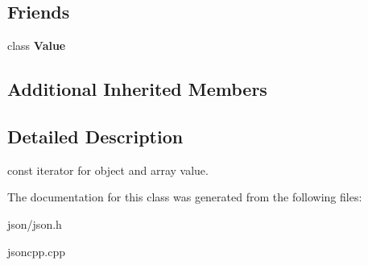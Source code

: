 \subsection*{Friends}
\begin{DoxyCompactItemize}
\item 
\mbox{\label{classJson_1_1ValueConstIterator_aeceedf6e1a7d48a588516ce2b1983d6f}} 
class {\bfseries Value}
\end{DoxyCompactItemize}
\subsection*{Additional Inherited Members}


\subsection{Detailed Description}
const iterator for object and array value. 



The documentation for this class was generated from the following files\+:\begin{DoxyCompactItemize}
\item 
json/json.\+h\item 
jsoncpp.\+cpp\end{DoxyCompactItemize}
